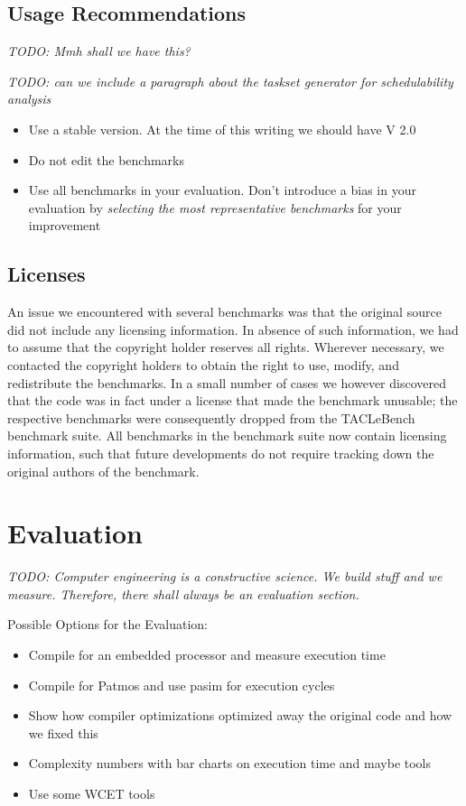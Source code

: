 \documentclass[a4paper,UKenglish]{oasics}
\newcommand{\todo}[1]{{\emph{TODO: #1}}}
\begin{document}
\subsection{Usage Recommendations}

\todo{Mmh shall we have this?}

\todo{can we include a paragraph about the taskset generator for schedulability analysis}

\begin{itemize}
\item Use a stable version. At the time of this writing we should have V 2.0
\item Do not edit the benchmarks
\item Use all benchmarks in your evaluation. Don't introduce a bias in your evaluation by
\emph{selecting the most representative benchmarks} for your improvement
\end{itemize}

\subsection{Licenses}

An issue we encountered with several benchmarks was that the original
source did not include any licensing information. In absence of such
information, we had to assume that the copyright holder reserves all
rights. Wherever necessary, we contacted the copyright holders to
obtain the right to use, modify, and redistribute the benchmarks. In a
small number of cases we however discovered that the code was in fact
under a license that made the benchmark unusable; the respective
benchmarks were consequently dropped from the TACLeBench benchmark
suite. All benchmarks in the benchmark suite now contain licensing
information, such that future developments do not require tracking
down the original authors of the benchmark.

\section{Evaluation}
\label{sec:eval}

\todo{Computer engineering is a constructive science. We build stuff and we measure.
Therefore, there shall always be an evaluation section.}

Possible Options for the Evaluation:

\begin{itemize}
\item Compile for an embedded processor and measure execution time
\item Compile for Patmos and use pasim for execution cycles
\item Show how compiler optimizations optimized away the original code and how we fixed this
\item Complexity numbers with bar charts on execution time and maybe tools
\item Use some WCET tools
\end{itemize}
\end{document}
